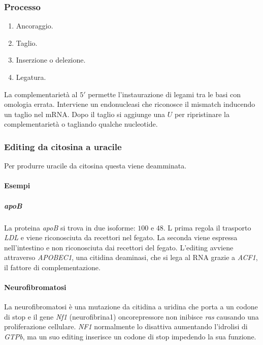 		\subsubsection{Processo}
		\begin{multicols}{2}
			\begin{enumerate}
				\item Ancoraggio.
				\item Taglio.
				\item Inserzione o delezione.
				\item Legatura.
			\end{enumerate}
		\end{multicols}
		La complementariet\`a al $5'$ permette l'instaurazione di legami tra le basi con omologia errata.
		Interviene un endonucleasi che riconosce il mismatch inducendo un taglio nel mRNA.
		Dopo il taglio si aggiunge una $U$ per ripristinare la complementariet\`a o tagliando qualche nucleotide.

		\subsubsection{Editing da citosina a uracile}
		Per produrre uracile da citosina questa viene deamminata.

			\paragraph{Esempi}

				\subparagraph{\emph{apoB}}
				La proteina \emph{apoB} si trova in due isoforme: $100$ e $48$.
				L prima regola il trasporto \emph{LDL} e viene riconosciuta da recettori nel fegato.
				La seconda viene espressa nell'intestino e non riconosciuta dai recettori del fegato.
				L'editing avviene attraverso \emph{APOBEC1}, una citidina deaminasi, che si lega al RNA grazie a \emph{ACF1}, il fattore di complementazione.

				\paragraph{Neurofibromatosi}
				La neurofibromatosi \`e una mutazione da citidina a uridina che porta a un codone di stop e il gene \emph{Nf1} (neurofibrina1) oncorepressore non inibisce \emph{ras} causando una proliferazione cellulare.
				\emph{NF1} normalmente lo disattiva aumentando l'idrolisi di \emph{GTPb}, ma un suo editing inserisce un codone di stop impedendo la sua funzione.


